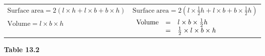 {{    \addtocounter{footnote}{-0}
    
          }{ %
        
    
        \begin{center}
      
      \label{m39357*eip-742}
      
    \noindent
      \tablelasttail{}
      \begin{xtabular}[t]{|l|l|}\hline
    
    
        $\mathrm{Surface\; area}=2\left(l\ensuremath{\times}h+l\ensuremath{\times}b+b\ensuremath{\times}h\right)$ &
    
    
        $\mathrm{Surface\; area}=2\left(l\ensuremath{\times}\frac{1}{2}h+l\ensuremath{\times}b+b\ensuremath{\times}\frac{1}{2}h\right)$%
     \tabularnewline{}
    
    
        $\mathrm{Volume}=l\ensuremath{\times}b\ensuremath{\times}h$ &
    
    
        $\begin{array}{ccc}\hfill \mathrm{Volume}& =& l\ensuremath{\times}b\ensuremath{\times}\frac{1}{2}h\hfill \\ & =& \frac{1}{2}\ensuremath{\times}l\ensuremath{\times}b\ensuremath{\times}h\hfill \end{array}$%
     \tabularnewline{}
    \end{xtabular}
      \end{center}
    \begin{center}{\small\bfseries Table 13.2}\end{center}
    
}}
